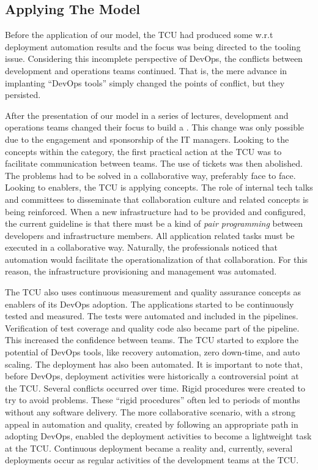 \subsection{Applying The Model}

Before the application of our model, the TCU had produced some w.r.t deployment
automation results and the focus was being directed to the tooling issue. Considering this
incomplete perspective of DevOps, the conflicts between development and operations
teams continued. That is, the mere advance in implanting ``DevOps tools'' simply
changed the points of conflict, but they persisted.

After the presentation of our  model in a series of lectures, development and
operations teams changed their focus to build a \cc. This
change was only possible due to the engagement and sponsorship of the IT
managers. Looking to the concepts within the \cc category, the first practical
action at the TCU was to facilitate communication between teams. The use of tickets
was then abolished. The problems had to be solved in a collaborative way, preferably
face to face.
Looking to enablers, the TCU is applying  concepts.
The role of internal tech talks and committees to disseminate that collaboration
culture and related concepts is being reinforced.
When a new infrastructure had to be provided and configured, the current guideline is
that there must be a kind of \emph{pair programming} between developers and infrastructure
members. All application related tasks must be executed in a collaborative
way. Naturally, the professionals noticed that automation would facilitate the
operationalization of that collaboration. For this reason, the infrastructure provisioning
and management was automated.

The TCU also uses continuous measurement and quality assurance concepts as
enablers of its DevOps adoption. The applications started to be continuously
tested and measured. The tests were automated and included in the pipelines.
Verification of test coverage and quality code also became part of the pipeline.
This increased the confidence between teams. The TCU started
to explore the potential of DevOps tools, like recovery automation, zero
down-time, and auto scaling. The deployment has also been automated.
It is important to note that, before DevOps, deployment activities were historically a controversial point at the TCU.
Several conflicts occurred over time. Rigid procedures were created to try to
avoid problems. These ``rigid procedures'' often led to periods of months
without any software delivery. The more collaborative scenario, with a strong appeal in automation and quality,
created by following an appropriate path in adopting DevOps, enabled the deployment activities to become
a lightweight task at the TCU. Continuous deployment became a reality and, currently, several deployments
occur as regular activities of the development teams at the TCU.

